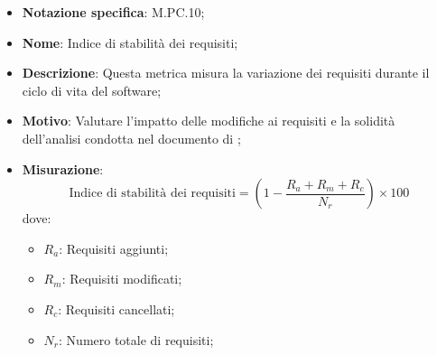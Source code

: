 \begin{itemize}
    \item \textbf{Notazione specifica}: M.PC.10;
    \item \textbf{Nome}: Indice di stabilità dei requisiti;
    \item \textbf{Descrizione}: Questa metrica misura la variazione dei requisiti durante il ciclo di vita del software;
    \item \textbf{Motivo}: Valutare l'impatto delle modifiche ai requisiti e la solidità dell'analisi condotta nel documento di \AnalisiDeiRequisiti;
    \item \textbf{Misurazione}:
    \[
        \text{Indice di stabilità dei requisiti} = (1 - \frac{R_a + R_m + R_c}{N_r}) \times 100
    \]
    dove:
    \begin{itemize}
      \item $R_{a}$: Requisiti aggiunti;
      \item $R_{m}$: Requisiti modificati;
      \item $R_{c}$: Requisiti cancellati;
      \item $N_{r}$: Numero totale di requisiti;
    \end{itemize}
\end{itemize}
